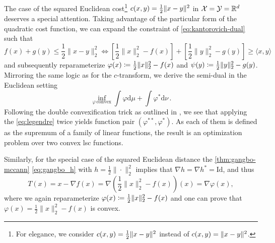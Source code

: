 The case of the squared Euclidean cost\footnote{For elegance, we consider $c(x, y) = \frac{1}{2}\lVert x-y\rVert^2$ instead of $c(x, y) = \lVert x-y\rVert^2$.} $c(x, y) = \frac{1}{2}\lVert x-y\rVert^2$ in ${\mathcal{X}} = {\mathcal{Y}} = \mathbb{R}^d$ deserves a special attention. 
Taking advantage of the particular form of the quadratic cost function, we can expand the constraint of \eqref{eq:kantorovich-dual} such that 
\begin{equation*}
	f(x)+g(y) \leq \frac{1}{2}\|x-y\|_2^2 \Longleftrightarrow  {\left[\frac{1}{2}\|x\|_2^2-f(x)\right]+\left[\frac{1}{2}\|y\|_2^2-g(y)\right] \geq\langle x, y\rangle}
\end{equation*}
and subsequently reparameterize $\varphi(x) \coloneqq \frac{1}{2}\|x\|_2^2-f(x)$ and $\psi(y) \coloneqq \frac{1}{2}\|y\|_2^2-g(y)$.
Mirroring the same logic as for the $c$-transform, we derive the semi-dual in the Euclidean setting 
\begin{equation} \label{eq:dual-cvx}
  \inf_{\varphi\, \text{convex}} \int \varphi \textrm{d}\mu + \int \varphi^*\textrm{d}\nu\,.
\end{equation}
Following the double convexification trick as outlined in \citet[Lemma 2.10]{villani2021topics}, we see that applying the \ref{eq:legendre} twice yields function pair $(\varphi^{**},\varphi^{*})$. As each of them is defined as the supremum of a family of linear functions, the result is an optimization problem over two convex \acrlong{lsc} functions.

Similarly, for the special case of the squared Euclidean distance the \cref{thm:gangbo-mccann} \eqref{eq:gangbo_h} with $h=\frac{1}{2}\|\cdot\|_2^2 $ implies that $\nabla h=\nabla h^*=\mathrm{Id}$, and thus
\begin{equation*}
	T(x)=x-\nabla f(x)=\nabla\left(\frac{1}{2}\|x\|^2_2-f(x)\right)(x)=\nabla \varphi(x),
\end{equation*}
where we again reparameterize $\varphi(x) \coloneqq \frac{1}{2}\|x\|^2_2-f(x)$ and one can prove that $\varphi(x) = \frac{1}{2}\|x\|_2^2-f(x)$ is convex.

